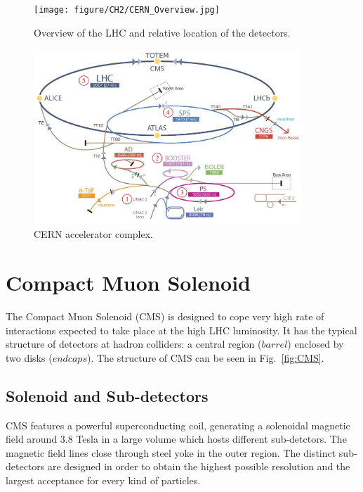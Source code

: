 \begin{figure}[hbtp]
  \begin{center}
    \texttt{[image: figure/CH2/CERN\_Overview.jpg]}
  \end{center}
  \caption{\label{fig:LHC_overview}Overview of the LHC and relative location of the detectors.}
\end{figure}

\begin{figure}[hbtp]
  \begin{center}
    \includegraphics[width=0.9\textwidth]{figure/CH2/complex.png}
  \end{center}
  \caption{\label{fig:accelerator}CERN accelerator complex.}
\end{figure}

\section{Compact Muon Solenoid}
The Compact Muon Solenoid (CMS) is designed to cope very high rate of interactions expected to take place at the high LHC luminosity. It has the typical structure of detectors at hadron colliders: a central region ($barrel$) enclosed by two disks ($endcaps$). The structure of CMS can be seen in Fig.~\ref{fig:CMS}.

\subsection*{Solenoid and Sub-detectors}
CMS features a powerful superconducting coil, generating a solenoidal magnetic field around 3.8 Tesla in a large volume which hosts different sub-detctors. The magnetic field lines close through steel yoke in the outer region. The distinct sub-detectors are designed in order to obtain the highest possible resolution and the largest acceptance for every kind of particles.


